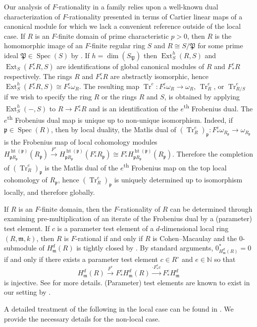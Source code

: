 \documentclass[reqno,11pt]{amsart}
\numberwithin{equation}{section}
\theoremstyle{definition}
\theoremstyle{definition}
\theoremstyle{definition}
\theoremstyle{remark}
\newcommand{\Spec}{\operatorname{Spec}}
\newcommand{\ts}{\textsuperscript}
\newcommand{\Height}{\operatorname{ht}}
\newcommand{\Ext}{\operatorname{Ext}}
\newcommand{\NN}{\mathbb{N}}
\newcommand{\Tr}{\operatorname{Tr}}
\newcommand{\fm}{\mathfrak{m}}
\newcommand{\fp}{\mathfrak{p}}
\newcommand{\fP}{\mathfrak{P}}
\begin{document}
Our analysis of $F$-rationality in a family relies upon a well-known dual characterization of $F$-rationality presented in terms of Cartier linear maps of a canonical module for which we lack a convenient reference outside of the local case. If $R$ is an $F$-finite domain of prime characteristic $p>0$, then $R$ is the homomorphic image of an $F$-finite regular ring $S$ and $R\cong S/\fP$ for some prime ideal $\fP\in \Spec(S)$ by \cite{Gab04}.  If $h= \dim(S_{\fP})$ then $\Ext_S^h(R,S)$ and $\Ext_S(F^e_*R,S)$ are identifications of global canonical modules of $R$ and $F^e_*R$ respectively. The rings $R$ and $F^e_*R$ are abstractly isomorphic, hence $\Ext_S^h(F^e_*R,S) \cong F^e_*\omega_R$. The resulting map $\Tr^e\colon F^e_*\omega_R\to \omega_R$, $\Tr^e_R$, or $\Tr^e_{R/S}$ if we wish to specify the ring $R$ or the rings $R$ and $S$, is obtained by applying $\Ext^h_S(-,S)$ to $R\to F^e_*R$ and is an identification of the $e$\ts{th} Frobenius dual. The $e$\ts{th} Frobenius dual map is unique up to non-unique isomorphism. Indeed, if $\fp\in \Spec(R)$, then by local duality, the Matlis dual of $(\Tr^{e}_R)_{\fp}\colon F^{e}_*\omega_{R_{\fp}}\to \omega_{R_{\fp}}$ is the Frobenius map of local cohomology modules $H^{\Height(\fp)}_{\fp R_{\fp}}(R_{\fp})\xrightarrow{F^e}H^{\Height(\fp)}_{\fp R_{\fp}}(F^e_*R_{\fp})\cong F^e_*H^{\Height(\fp)}_{\fp R_{\fp}}(R_{\fp})$. Therefore the completion of $(\Tr^{e}_R)_{\fp}$ is the Matlis dual of the $e$\ts{th} Frobenius map on the top local cohomology of $R_\fp$, hence $(\Tr^{e}_R)_{\fp}$ is uniquely determined up to isomorphism locally, and therefore globally.

If $R$ is an $F$-finite domain, then the $F$-rationality of $R$ can be determined through examining pre-multiplication of an iterate of the Frobenius dual by a (parameter) test element. If $c$ is a parameter test element of a $d$-dimensional local ring $(R,\fm,k)$, then $R$ is $F$-rational if and only if $R$ is Cohen--Macaulay and the $0$-submodule of $H^d_{\fm}(R)$ is tightly closed by \cite[Proposition~2.5 and Theorem~2.6]{Smi97}. By standard arguments, $0^*_{H^d_{\fm}(R)} = 0$ if and only if there exists a parameter test element $c\in R^{\circ}$ and $e\in\NN$ so that $$H^d_{\fm}(R)\xrightarrow{F^e}F^e_*H^d_{\fm}(R)\xrightarrow{\cdot F^e_*c}F^e_*H^d_{\fm}$$ is injective. See \cite[Proof of Proposition~6.3]{MP25} for more details. (Parameter) test elements are known to exist in our setting by \cite[Theorem~5.10]{HH94a}.

A detailed treatment of the following in the local case can be found in \cite[Proposition~6.3]{MP25}. We provide the necessary details for the non-local case.
\end{document}
